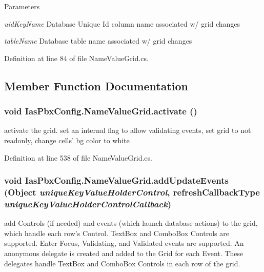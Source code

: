 \begin{DoxyParams}{Parameters}
\item[{\em uidKeyName}]Database Unique Id column name associated w/ grid changes \item[{\em tableName}]Database table name associated w/ grid changes \end{DoxyParams}


Definition at line 84 of file NameValueGrid.cs.

\subsection{Member Function Documentation}
\hypertarget{class_ias_pbx_config_1_1_name_value_grid_a26d39bc7c64da504edfe7243f311ff22}{
\subsubsection[{activate}]{\setlength{\rightskip}{0pt plus 5cm}void IasPbxConfig.NameValueGrid.activate ()}}
\label{class_ias_pbx_config_1_1_name_value_grid_a26d39bc7c64da504edfe7243f311ff22}


activate the grid. set an internal flag to allow validating events, set grid to not readonly, change cells' bg color to white 

Definition at line 538 of file NameValueGrid.cs.\hypertarget{class_ias_pbx_config_1_1_name_value_grid_a5f999a6912fe2342c2edef12bd6d1e2f}{
\subsubsection[{addUpdateEvents}]{\setlength{\rightskip}{0pt plus 5cm}void IasPbxConfig.NameValueGrid.addUpdateEvents (Object {\em uniqueKeyValueHolderControl}, \/  refreshCallbackType {\em uniqueKeyValueHolderControlCallback})}}
\label{class_ias_pbx_config_1_1_name_value_grid_a5f999a6912fe2342c2edef12bd6d1e2f}


add Controls (if needed) and events (which launch database actions) to the grid, which handle each row's Control. TextBox and ComboBox Controls are supported. Enter Focus, Validating, and Validated events are supported. An anonymous delegate is created and added to the Grid for each Event. These delegates handle TextBox and ComboBox Controls in each row of the grid.


